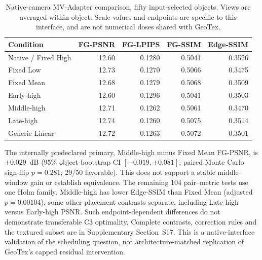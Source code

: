 \documentclass[times,twocolumn,final]{elsarticle}
\providecommand{\DIFadd}[1]{{\protect\color{blue} \sf #1}} %
\providecommand{\DIFaddbegin}{} %
\providecommand{\DIFaddend}{} %
\providecommand{\DIFaddFL}[1]{\DIFadd{#1}} %
\renewcommand{\DIFaddFL}[1]{#1}
\begin{document}
\begin{table}[ht]\centering\scriptsize
\caption{Native-camera MV-Adapter comparison, fifty input-selected objects. Views are averaged within object. Scale values and endpoints are specific to this interface, and are not numerical doses shared with GeoTex.}\label{tab:new-mva}
\begin{tabular}{lrrrr}
\toprule \DIFaddFL{Condition }& \DIFaddFL{FG-PSNR }& \DIFaddFL{FG-LPIPS }& \DIFaddFL{FG-SSIM }& \DIFaddFL{Edge-SSIM }\\
\midrule
\DIFaddFL{Native / Fixed High }& \DIFaddFL{12.60 }& \DIFaddFL{0.1280 }& \DIFaddFL{0.5041 }& \DIFaddFL{0.3526 }\\
\DIFaddFL{Fixed Low }& \DIFaddFL{12.73 }& \DIFaddFL{0.1270 }& \DIFaddFL{0.5066 }& \DIFaddFL{0.3475 }\\
\DIFaddFL{Fixed Mean }& \DIFaddFL{12.68 }& \DIFaddFL{0.1279 }& \DIFaddFL{0.5068 }& \DIFaddFL{0.3509 }\\
\DIFaddFL{Early-high }& \DIFaddFL{12.60 }& \DIFaddFL{0.1296 }& \DIFaddFL{0.5041 }& \DIFaddFL{0.3503 }\\
\DIFaddFL{Middle-high }& \DIFaddFL{12.71 }& \DIFaddFL{0.1262 }& \DIFaddFL{0.5061 }& \DIFaddFL{0.3470 }\\
\DIFaddFL{Late-high }& \DIFaddFL{12.74 }& \DIFaddFL{0.1260 }& \DIFaddFL{0.5075 }& \DIFaddFL{0.3514 }\\
\DIFaddFL{Generic Linear }& \DIFaddFL{12.72 }& \DIFaddFL{0.1263 }& \DIFaddFL{0.5072 }& \DIFaddFL{0.3501 }\\
\bottomrule\end{tabular}\end{table}

\DIFadd{The internally predeclared primary, Middle-high minus Fixed Mean FG-PSNR, is $+0.029$~dB (95\% object-bootstrap CI $[-0.019,+0.081]$; paired Monte Carlo sign-flip $p=0.281$; 29/50 favorable). This does not support a stable middle-window gain or establish equivalence. The remaining 104 pair--metric tests use one Holm family. Middle-high has lower Edge-SSIM than Fixed Mean (adjusted $p=0.00104$); some other placement contrasts separate, including Late-high versus Early-high PSNR. Such endpoint-dependent differences do not demonstrate transferable }\DIFaddend C3   \DIFaddbegin \DIFadd{optimality. Complete contrasts, correction rules and the textured subset are in Supplementary Section~S17. This is a native-interface validation of the scheduling question, not architecture-matched replication of GeoTex's capped residual intervention}\DIFaddend .
\end{document}
